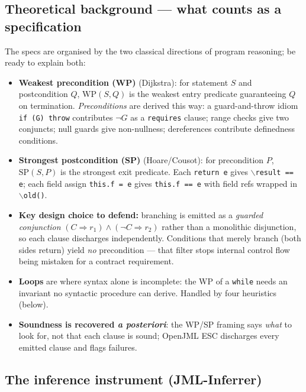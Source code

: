\documentclass[11pt]{article}
\begin{document}
\subsection{Theoretical background --- what counts as a specification}

The specs are organised by the two classical directions of program reasoning;
be ready to explain both:
\begin{itemize}[leftmargin=1.4em,itemsep=0.1em]
  \item \textbf{Weakest precondition (WP)} (Dijkstra): for statement $S$ and
        postcondition $Q$, $\mathrm{WP}(S,Q)$ is the weakest entry predicate
        guaranteeing $Q$ on termination. \emph{Preconditions} are derived this
        way: a guard-and-throw idiom \texttt{if (G) throw} contributes
        $\neg G$ as a \texttt{requires} clause; range checks give two
        conjuncts; null guards give non-nullness; dereferences contribute
        definedness conditions.
  \item \textbf{Strongest postcondition (SP)} (Hoare/Cousot): for precondition
        $P$, $\mathrm{SP}(S,P)$ is the strongest exit predicate. Each
        \texttt{return e} gives $\backslash$\texttt{result == e}; each field
        assign \texttt{this.f = e} gives \texttt{this.f == e} with field refs
        wrapped in $\backslash$\texttt{old()}.
  \item \textbf{Key design choice to defend:} branching is emitted as a
        \emph{guarded conjunction} $(C \Rightarrow r_1) \land (\neg C
        \Rightarrow r_2)$ rather than a monolithic disjunction, so each clause
        discharges independently. Conditions that merely branch (both sides
        return) yield \emph{no} precondition --- that filter stops internal
        control flow being mistaken for a contract requirement.
  \item \textbf{Loops} are where syntax alone is incomplete: the WP of a
        \texttt{while} needs an invariant no syntactic procedure can derive.
        Handled by four heuristics (below).
  \item \textbf{Soundness is recovered \emph{a posteriori}}: the WP/SP framing
        says \emph{what} to look for, not that each clause is sound; OpenJML
        ESC discharges every emitted clause and flags failures.
\end{itemize}

\subsection{The inference instrument (JML-Inferrer)}
\end{document}
